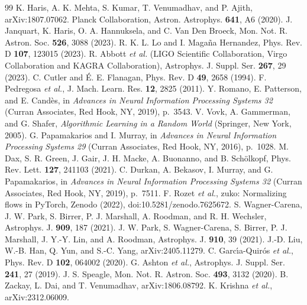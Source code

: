 \begin{thebibliography}{99}
K. Haris, A. K. Mehta, S. Kumar, T. Venumadhav, and P. Ajith, arXiv:1807.07062.
Planck Collaboration, Astron. Astrophys. \textbf{641}, A6 (2020).
J. Janquart, K. Haris, O. A. Hannuksela, and C. Van Den Broeck, Mon. Not. R. Astron. Soc. \textbf{526}, 3088 (2023).
R. K. L. Lo and I. Maga{\~n}a Hernandez, Phys. Rev. D \textbf{107}, 123015 (2023).
R. Abbott \textit{et al.} (LIGO Scientific Collaboration, Virgo Collaboration and KAGRA Collaboration), Astrophys. J. Suppl. Ser. \textbf{267}, 29 (2023).
C. Cutler and {\'E}. E. Flanagan, Phys. Rev. D \textbf{49}, 2658 (1994).
F. Pedregosa \textit{et al.}, J. Mach. Learn. Res. \textbf{12}, 2825 (2011).
Y. Romano, E. Patterson, and E. Cand{\`e}s, in \textit{Advances in Neural Information Processing Systems 32} (Curran Associates, Red Hook, NY, 2019), p.~3543.
V. Vovk, A. Gammerman, and G. Shafer, \textit{Algorithmic Learning in a Random World} (Springer, New York, 2005).
G. Papamakarios and I. Murray, in \textit{Advances in Neural Information Processing Systems 29} (Curran Associates, Red Hook, NY, 2016), p.~1028.
M. Dax, S. R. Green, J. Gair, J. H. Macke, A. Buonanno, and B. Sch{\"o}lkopf, Phys. Rev. Lett. \textbf{127}, 241103 (2021).
C. Durkan, A. Bekasov, I. Murray, and G. Papamakarios, in \textit{Advances in Neural Information Processing Systems 32} (Curran Associates, Red Hook, NY, 2019), p.~7511.
F. Rozet \textit{et al.}, zuko: Normalizing flows in PyTorch, Zenodo (2022), doi:10.5281/zenodo.7625672.
S. Wagner-Carena, J. W. Park, S. Birrer, P. J. Marshall, A. Roodman, and R. H. Wechsler, Astrophys. J. \textbf{909}, 187 (2021).
J. W. Park, S. Wagner-Carena, S. Birrer, P. J. Marshall, J. Y.-Y. Lin, and A. Roodman, Astrophys. J. \textbf{910}, 39 (2021).
J.-D. Liu, W.-B. Han, Q. Yun, and S.-C. Yang, arXiv:2405.11279.
C. Garc{\'\i}a-Quir{\'o}s \textit{et al.}, Phys. Rev. D \textbf{102}, 064002 (2020).
G. Ashton \textit{et al.}, Astrophys. J. Suppl. Ser. \textbf{241}, 27 (2019).
J. S. Speagle, Mon. Not. R. Astron. Soc. \textbf{493}, 3132 (2020).
B. Zackay, L. Dai, and T. Venumadhav, arXiv:1806.08792.
K. Krishna \textit{et al.}, arXiv:2312.06009.
\end{thebibliography}
